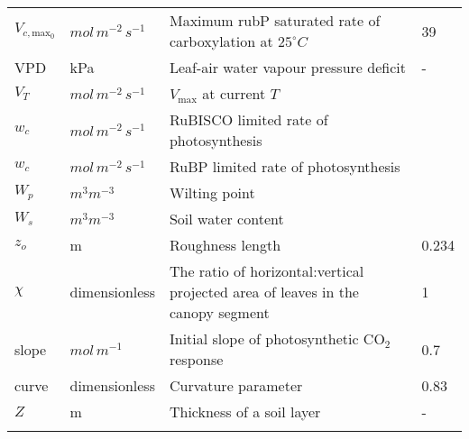 \documentclass[10pt]{article}
\begin{document}
\begin{center}
\begin{longtable}{l l p{3in} p{0.5in}}
$V_{c,\text{max}_0}$	&	$mol\, m^{-2}\, s^{-1}$ 	&	Maximum rubP saturated rate of carboxylation at $25^\circ C$	&	39	\\
VPD	&	kPa	&	Leaf-air water vapour pressure deficit	&	-	\\
$V_T$ & $mol\, m^{-2}\, s^{-1}$  &$V_\text{max}$ at current $T$ & \\
$w_c$ & 	$mol\, m^{-2}\, s^{-1}$\marginnote{units?} & RuBISCO limited rate of photosynthesis & \\
$w_c$ & 	$mol\, m^{-2}\, s^{-1}$\marginnote{units?} & RuBP limited rate of photosynthesis & \\
$W_p$ & $m^3m^{-3}$ & Wilting point & \\
$W_s$ & $m^3m^{-3}$ & Soil water content & \\
$z_o$	&	m	&	Roughness length	&	0.234	\\
$\chi$	&	dimensionless	&	The ratio of horizontal:vertical projected area of leaves in the canopy segment	&	1	\\
slope	&	$mol\, m^{-1}$ 	&	Initial slope of photosynthetic CO$_2$ response	&	0.7	\\
curve	&	dimensionless	&	Curvature parameter	&	0.83	\\
$Z$	&	m	&	Thickness of a soil layer	&	-	\\
\\
\end{longtable}
\end{center}
\end{document}
